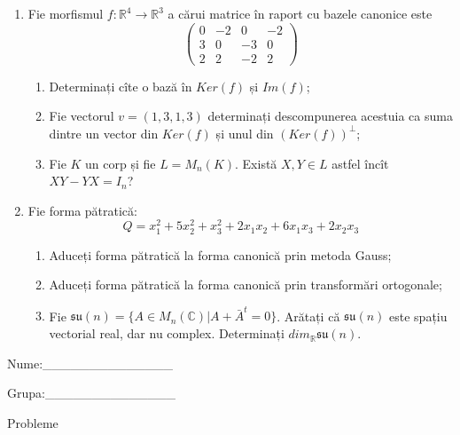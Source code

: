 \documentclass{article}
\begin{document}
\begin{enumerate}
 \item Fie morfismul $f:\mathbb{R}^4 \to \mathbb{R}^3$ a cărui matrice în raport cu bazele canonice este
$$\begin{pmatrix}
0&-2&0&-2\\
3&0&-3&0\\
2&2&-2&2
\end{pmatrix}$$

\begin{enumerate}
\item Determinați cîte o bază în $Ker(f)$ și $Im(f)$;
\item Fie vectorul $v=(1,3,1,3)$ determinați descompunerea acestuia ca suma dintre un vector din $Ker(f)$ și unul din $(Ker(f))^\perp$;
\item Fie $K$ un corp și fie $L=M_n(K)$. Există $X,Y \in L$ astfel încît $XY-YX=I_n$?  
\end{enumerate}
\item Fie forma pătratică:
$$Q= x_1^2+5x_2^2+x_3^2+2x_1x_2+6x_1x_3+2x_2x_3$$

\begin{enumerate}
\item Aduceți forma pătratică la forma canonică prin metoda Gauss;
\item Aduceți forma pătratică la forma canonică prin transformări ortogonale;
\item Fie $\mathfrak{su}(n)=\{ A \in M_n(\mathbb{C}) | A+\bar{A}^t=0\}$. Arătați că $\mathfrak{su}(n)$ este spațiu vectorial real, dar nu complex.
Determinați $dim_{\mathbb{R}}\mathfrak{su}(n)$.
\end{enumerate}
\end{enumerate}
\newpage
\begin{flushright}
Nume:\_\_\_\_\_\_\_\_\_\_\_\_\_\_
 
 
Grupa:\_\_\_\_\_\_\_\_\_\_\_\_\_\_
\end{flushright}
\begin{center}
\vspace{2cm}
{\Large Probleme}
\vspace{2cm}
\end{center}
\end{document}
